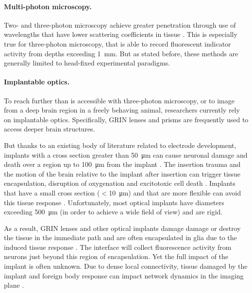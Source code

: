 \paragraph{Multi-photon microscopy.} Two- and three-photon 
microscopy achieve greater penetration through use of 
wavelengths that have lower scattering coefficients in 
tissue \cite{Wang:2017jp}. This is especially true for 
three-photon microscopy, that is able to record 
fluorescent indicator activity from depths exceeding 1~mm.
But as stated before, these methods are generally 
limited to head-fixed experimental paradigms.

\paragraph{Implantable optics.} To reach further than 
is accessible with three-photon microscopy, or to image 
from a deep brain region in a freely behaving animal, 
researchers currently rely on implantable optics. 
Specifically, GRIN lenses \cite{Barretto:2009hk} and 
prisms \cite{Andermann:2013kc} are frequently used to 
access deeper brain structures.

But thanks to an existing body of literature related to 
electrode development, implants with a cross section 
greater than 50~\si{\micro\meter} can cause neuronal 
damage and death over a region up to 100~\si{\micro\meter}
from the implant \cite{Seymour:2007dj}. The insertion 
trauma and the motion of the brain relative to the implant 
after insertion can trigger tissue encapsulation, 
disruption of oxygenation and  excitotoxic cell death
\cite{Szarowski:2003cz,Polikov:2005cq,McConnell:2009hr,Freire:2011gl}.
Implants that have a small cross section ($<$10~\si{\micro\meter}) 
and that are more flexible can avoid this tissue response 
\cite{JohnPSeymour:2006td,Harris:2011dy,Kozai:2012bp,Patel:2018cr}.
Unfortunately, most optical implants have diameters exceeding 
500~\si{\micro\meter} (in order to achieve a wide field of view) 
and are rigid.

As a result, GRIN lenses and other optical implants damage 
damage or destroy the tissue in the immediate path and 
are often encapsulated in glia due to the induced  
tissue response \cite{Lee:2016ko}. The interface will 
collect fluorescence activity from neurons just beyond this 
region of encapsulation. Yet the full impact of the implant 
is often unknown. Due to dense local connectivity, tissue 
damaged by the implant and foreign body response can impact 
network dynamics in the imaging plane 
\cite{Hayn:2015ew,Hayn:2017kj,GossVarley:2017kf}.


